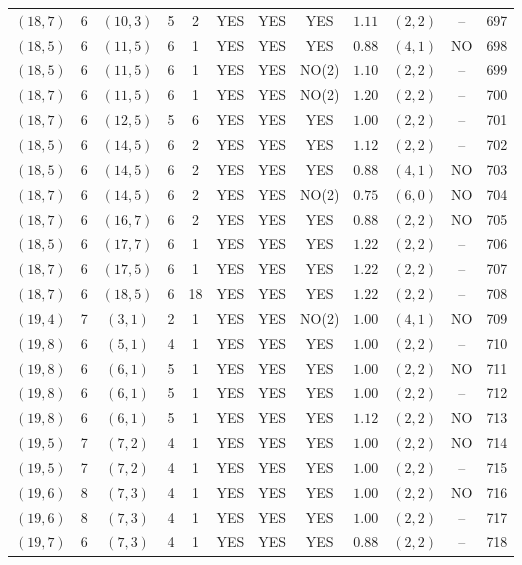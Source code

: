 \begin{longtable}{|c|c|c|c|c|c|c|c|c|c|c|c|}
$(18,7)$ & 6 & $(10,3)$ & 5 & 2 & YES & YES & YES & $1.11$ & $(2,2)$ & -- & 697\\
$(18,5)$ & 6 & $(11,5)$ & 6 & 1 & YES & YES & YES & $0.88$ & $(4,1)$ & NO & 698\\
$(18,5)$ & 6 & $(11,5)$ & 6 & 1 & YES & YES & NO(2) & $1.10$ & $(2,2)$ & -- & 699\\
$(18,7)$ & 6 & $(11,5)$ & 6 & 1 & YES & YES & NO(2) & $1.20$ & $(2,2)$ & -- & 700\\
$(18,7)$ & 6 & $(12,5)$ & 5 & 6 & YES & YES & YES & $1.00$ & $(2,2)$ & -- & 701\\
$(18,5)$ & 6 & $(14,5)$ & 6 & 2 & YES & YES & YES & $1.12$ & $(2,2)$ & -- & 702\\
$(18,5)$ & 6 & $(14,5)$ & 6 & 2 & YES & YES & YES & $0.88$ & $(4,1)$ & NO & 703\\
$(18,7)$ & 6 & $(14,5)$ & 6 & 2 & YES & YES & NO(2) & $0.75$ & $(6,0)$ & NO & 704\\
$(18,7)$ & 6 & $(16,7)$ & 6 & 2 & YES & YES & YES & $0.88$ & $(2,2)$ & NO & 705\\
$(18,5)$ & 6 & $(17,7)$ & 6 & 1 & YES & YES & YES & $1.22$ & $(2,2)$ & -- & 706\\
$(18,7)$ & 6 & $(17,5)$ & 6 & 1 & YES & YES & YES & $1.22$ & $(2,2)$ & -- & 707\\
$(18,7)$ & 6 & $(18,5)$ & 6 & 18 & YES & YES & YES & $1.22$ & $(2,2)$ & -- & 708\\
$(19,4)$ & 7 & $(3,1)$ & 2 & 1 & YES & YES & NO(2) & $1.00$ & $(4,1)$ & NO & 709\\
$(19,8)$ & 6 & $(5,1)$ & 4 & 1 & YES & YES & YES & $1.00$ & $(2,2)$ & -- & 710\\
$(19,8)$ & 6 & $(6,1)$ & 5 & 1 & YES & YES & YES & $1.00$ & $(2,2)$ & NO & 711\\
$(19,8)$ & 6 & $(6,1)$ & 5 & 1 & YES & YES & YES & $1.00$ & $(2,2)$ & -- & 712\\
$(19,8)$ & 6 & $(6,1)$ & 5 & 1 & YES & YES & YES & $1.12$ & $(2,2)$ & NO & 713\\
$(19,5)$ & 7 & $(7,2)$ & 4 & 1 & YES & YES & YES & $1.00$ & $(2,2)$ & NO & 714\\
$(19,5)$ & 7 & $(7,2)$ & 4 & 1 & YES & YES & YES & $1.00$ & $(2,2)$ & -- & 715\\
$(19,6)$ & 8 & $(7,3)$ & 4 & 1 & YES & YES & YES & $1.00$ & $(2,2)$ & NO & 716\\
$(19,6)$ & 8 & $(7,3)$ & 4 & 1 & YES & YES & YES & $1.00$ & $(2,2)$ & -- & 717\\
$(19,7)$ & 6 & $(7,3)$ & 4 & 1 & YES & YES & YES & $0.88$ & $(2,2)$ & -- & 718\\

\end{longtable}
